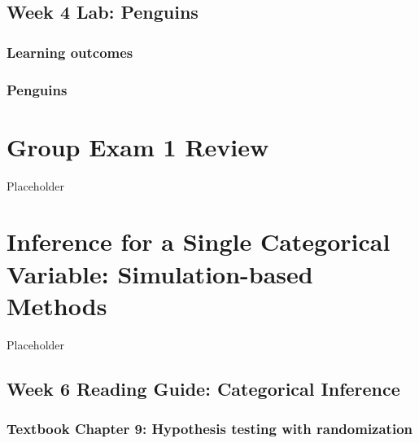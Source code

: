 \documentclass[
]{report}
\begin{document}
\hypertarget{week-4-lab-penguins}{%
\section{Week 4 Lab: Penguins}\label{week-4-lab-penguins}}

\hypertarget{learning-outcomes-8}{%
\subsection{Learning outcomes}\label{learning-outcomes-8}}

\hypertarget{penguins}{%
\subsection*{Penguins}\label{penguins}}

\hypertarget{group-exam-1-review}{%
\chapter{Group Exam 1 Review}\label{group-exam-1-review}}

Placeholder

\hypertarget{inference-for-a-single-categorical-variable-simulation-based-methods}{%
\chapter{Inference for a Single Categorical Variable: Simulation-based Methods}\label{inference-for-a-single-categorical-variable-simulation-based-methods}}

Placeholder

\hypertarget{week-6-reading-guide-categorical-inference}{%
\section{Week 6 Reading Guide: Categorical Inference}\label{week-6-reading-guide-categorical-inference}}

\hypertarget{textbook-chapter-9-hypothesis-testing-with-randomization}{%
\subsection*{Textbook Chapter 9: Hypothesis testing with randomization}\label{textbook-chapter-9-hypothesis-testing-with-randomization}}
\end{document}
